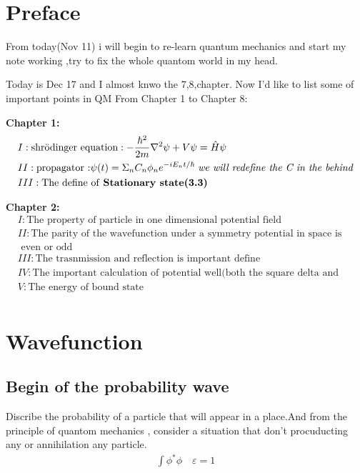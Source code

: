 \documentclass{article}
\begin{document}
\section{Preface}


From today(Nov 11) i will begin to re-learn quantum mechanics and start my note working ,try to fix the whole quantom world in my head.

Today is Dec 17 and I almost knwo the 7,8,chapter.
Now I'd like to list some of important points in QM From Chapter 1 to Chapter 8:

\textbf{Chapter 1:}
\begin{align*}
&I:\text{shr\"odinger equation}:-\frac{\hbar^2}{2m}\nabla^2\psi+V\psi=\hat H\psi \\
&II:\text{propagator :}\psi(t)=\Sigma_n C_n\phi_ne^{-iE_nt/\hbar} \;\text{\textit{we will redefine the C in the behind}}\\
&III:\text{The define of \textbf{Stationary state(3.3) }} \\
\end{align*}

\textbf{Chapter 2:}
\begin{align*}
&I:\text{The property of particle in one dimensional potential field}\\
&II:\text{The parity of the wavefunction under a symmetry potential in space is}\\&\text{ even or odd}\\
&III:\text{The trasnmission and reflection is important define}\\
&IV:\text{The important calculation of potential well(both the square delta and oscillator)}\\
&V:\text{The energy of bound state} \\
\end{align*}

\section{Wavefunction}
\subsection{Begin of the probability wave}
Discribe the probability of a particle that will appear in a place.And from the principle of quantom mechanics , consider a situation that don't procuducting any or annihilation any particle. 
\begin{align}
  \int \phi^*\phi \quad\varepsilon=1
  \label{eq:normalization}
\end{align}
\end{document}

